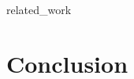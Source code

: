 \documentclass[11pt, a4paper]{article} %
\theoremstyle{definition}
\begin{document}
{related_work}



\section{Conclusion}

\newpage %

%
\medskip
\end{document}
